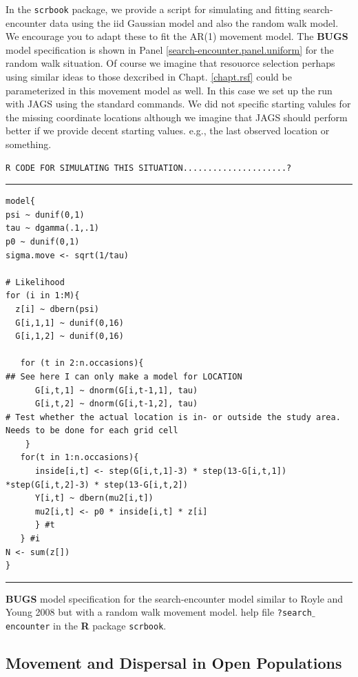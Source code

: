 In the \mbox{\tt scrbook} package, we provide a script for
simulating and fitting search-encounter data using the iid Gaussian
model and also the random walk model. We encourage you to adapt these
to fit the AR(1) movement model.   The {\bf BUGS} model specification
is shown in Panel \ref{search-encounter.panel.uniform} for the random
walk situation.  Of course we imagine that resouorce selection
perhaps using similar ideas to those dexcribed in
Chapt. \ref{chapt.rsf} could be parameterized in this movement model
as well. In this case we set up the run with JAGS using the standard
commands. We did not specific starting valules for the missing
coordinate locations although we imagine that JAGS should perform
better if we provide decent starting values. e.g., the last observed
location or something.

\begin{verbatim}
R CODE FOR SIMULATING THIS SITUATION.....................?
\end{verbatim}



\begin{panel}[htp]
\centering
\rule[0.15in]{\textwidth}{.03in}
{\small
\begin{verbatim}
model{
psi ~ dunif(0,1)
tau ~ dgamma(.1,.1)
p0 ~ dunif(0,1)
sigma.move <- sqrt(1/tau)

# Likelihood
for (i in 1:M){
  z[i] ~ dbern(psi)
  G[i,1,1] ~ dunif(0,16)
  G[i,1,2] ~ dunif(0,16)

   for (t in 2:n.occasions){
## See here I can only make a model for LOCATION
      G[i,t,1] ~ dnorm(G[i,t-1,1], tau)
      G[i,t,2] ~ dnorm(G[i,t-1,2], tau)
# Test whether the actual location is in- or outside the study area. Needs to be done for each grid cell
    }
   for(t in 1:n.occasions){
      inside[i,t] <- step(G[i,t,1]-3) * step(13-G[i,t,1]) *step(G[i,t,2]-3) * step(13-G[i,t,2])
      Y[i,t] ~ dbern(mu2[i,t])
      mu2[i,t] <- p0 * inside[i,t] * z[i]
      } #t
   } #i
N <- sum(z[])
}
\end{verbatim}
}
\rule[-0.15in]{\textwidth}{.03in}
\caption{
{\bf BUGS} model specification for the search-encounter model similar
to Royle and Young 2008 but with a random walk movement model.
help file \mbox{\tt ?search$\_$encounter} in the {\bf R} package \mbox{\tt scrbook}.
}
\label{search-encounter.panel.uniform}
\end{panel}

\subsection{Movement and Dispersal in Open Populations}

